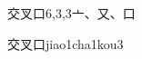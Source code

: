 \begin{entry}{交叉口}{6,3,3}{⼇、⼜、⼝}
  \begin{phonetics}{交叉口}{jiao1cha1kou3}
  \end{phonetics}
\end{entry}
